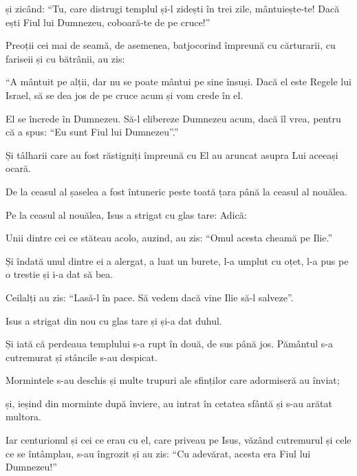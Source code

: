 {și zicând: “Tu, care distrugi templul și-l zidești în trei zile, mântuiește-te! Dacă ești Fiul lui Dumnezeu, coboară-te de pe cruce!”


\par }{\PP {}Preoții cei mai de seamă, de asemenea, batjocorind împreună cu cărturarii, cu fariseii și cu bătrânii, au zis:

“A mântuit pe alții, dar nu se poate mântui pe sine însuși. Dacă el este Regele lui Israel, să se dea jos de pe cruce acum și vom crede în el.

El se încrede în Dumnezeu. Să-l elibereze Dumnezeu acum, dacă îl vrea, pentru că a spus: “Eu sunt Fiul lui Dumnezeu”.”

Și tâlharii care au fost răstigniți împreună cu El au aruncat asupra Lui aceeași ocară.


\par }{\PP {}De la ceasul al șaselea a fost întuneric peste toată țara până la ceasul al nouălea.

Pe la ceasul al nouălea, Isus a strigat cu glas tare:
{}Adică:
{}


\par }{\PP {}Unii dintre cei ce stăteau acolo, auzind, au zis: “Omul acesta cheamă pe Ilie.”


\par }{\PP {}Și îndată unul dintre ei a alergat, a luat un burete, l-a umplut cu oțet, l-a pus pe o trestie și i-a dat să bea.

Ceilalți au zis: “Lasă-l în pace. Să vedem dacă vine Ilie să-l salveze”.


\par }{\PP {}Isus a strigat din nou cu glas tare și și-a dat duhul.


\par }{\PP {}Și iată că perdeaua templului s-a rupt în două, de sus până jos. Pământul s-a cutremurat și stâncile s-au despicat.

Mormintele s-au deschis și multe trupuri ale sfinților care adormiseră au înviat;

și, ieșind din morminte după înviere, au intrat în cetatea sfântă și s-au arătat multora.


\par }{\PP {}Iar centurionul și cei ce erau cu el, care priveau pe Isus, văzând cutremurul și cele ce se întâmplau, s-au îngrozit și au zis: “Cu adevărat, acesta era Fiul lui Dumnezeu!”


}
